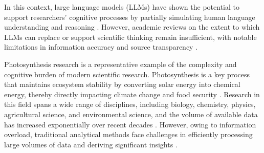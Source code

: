 \documentclass[12pt]{article}
\begin{document}
In this context, large language models (LLMs) have shown the potential to support researchers' cognitive processes by partially simulating human language understanding and reasoning \cite{ref5, ref6, ref7}. However, academic reviews on the extent to which LLMs can replace or support scientific thinking remain insufficient, with notable limitations in information accuracy and source transparency \cite{ref8, ref9, ref10}.

Photosynthesis research is a representative example of the complexity and cognitive burden of modern scientific research. Photosynthesis is a key process that maintains ecosystem stability by converting solar energy into chemical energy, thereby directly impacting climate change and food security \cite{ref11, ref12, ref13}. Research in this field spans a wide range of disciplines, including biology, chemistry, physics, agricultural science, and environmental science, and the volume of available data has increased exponentially over recent decades \cite{ref14, ref15, ref16, ref17}. However, owing to information overload, traditional analytical methods face challenges in efficiently processing large volumes of data and deriving significant insights \cite{ref4, ref18, ref19}.
\end{document}
